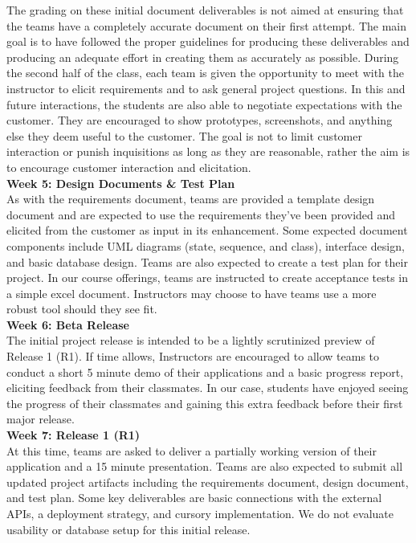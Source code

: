\documentclass{sig-alternate}
\begin{document}
The grading on these initial document deliverables is not aimed at ensuring that the teams have a completely accurate document on their first attempt. The main goal is to have followed the proper guidelines for producing these deliverables and producing an adequate effort in creating them as accurately as possible. During the second half of the class, each team is given the opportunity to meet with the instructor to elicit requirements and to ask general project questions. In this and future interactions, the students are also able to negotiate expectations with the customer. They are encouraged to show prototypes, screenshots, and anything else they deem useful to the customer. The goal is not to limit customer interaction or punish inquisitions as long as they are reasonable, rather the aim is to encourage customer interaction and elicitation.\\

\textbf{Week 5: Design Documents \& Test Plan}\\
As with the requirements document, teams are provided a template design document and are expected to use the requirements they've been provided and elicited from the customer as input in its enhancement. Some expected document components include UML diagrams (state, sequence, and class), interface design, and basic database design. Teams are also expected to create a test plan for their project. In our course offerings, teams are instructed to create acceptance tests in a simple excel document. Instructors may choose to have teams use a more robust tool should they see fit. \\

\textbf{Week 6: Beta Release}\\
The initial project release is intended to be a lightly scrutinized preview of Release 1 (R1). If time allows, Instructors are encouraged to allow teams to conduct a short 5 minute demo of their applications and a basic progress report, eliciting feedback from their classmates. In our case, students have enjoyed seeing the progress of their classmates and gaining this extra feedback before their first major release.\\

\textbf{Week 7: Release 1 (R1)}\\
At this time, teams are asked to deliver a partially working version of their application and a 15 minute presentation. Teams are also expected to submit all updated project artifacts including the requirements document, design document, and test plan. Some key deliverables are basic connections with the external APIs, a deployment strategy, and cursory implementation. We do not evaluate usability or database setup for this initial release.
\end{document}
